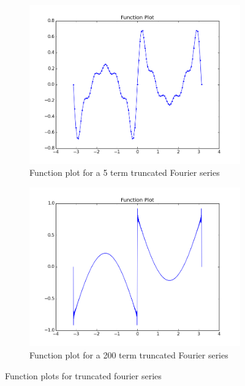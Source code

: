 \documentclass[11pt]{article}
\begin{document}
\begin{figure}
        \centering
        \begin{subfigure}{.5\textwidth}
  \centering
        \includegraphics[width=\linewidth]{q4/function.png}
                \caption{Function plot for a 5 term truncated Fourier series}
                \label{fig:q4_5}
                \end{subfigure}%
\begin{subfigure}{.5\textwidth}
  \centering
        \includegraphics[width=\linewidth]{q4/function_200.png}
                \caption{Function plot for a 200 term truncated Fourier series}
                \label{fig:q4_200}
	\end{subfigure}
            
\caption{Function plots for truncated fourier series}
\label{fig:q4}            
\end{figure}
\end{document}
